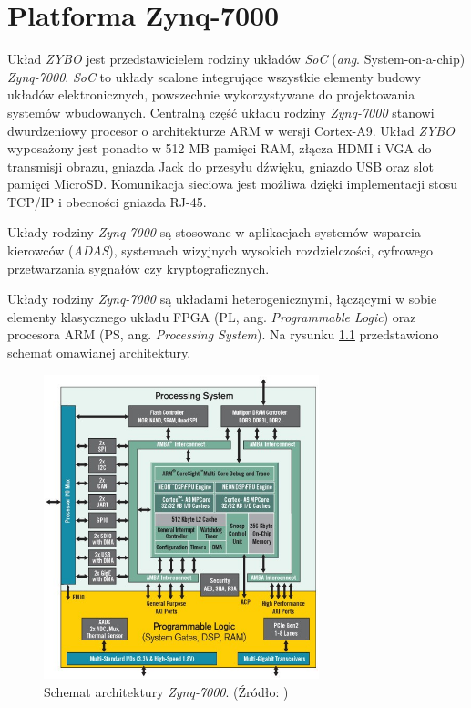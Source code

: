 \chapter{Platforma Zynq-7000}
\label{cha:platform}

Układ \emph{ZYBO} jest przedstawicielem rodziny układów \emph{SoC} (\emph{ang}. System-on-a-chip) \emph{Zynq-7000}. \emph{SoC} to układy scalone integrujące wszystkie elementy budowy układów elektronicznych, powszechnie wykorzystywane do projektowania systemów wbudowanych. Centralną część układu rodziny \emph{Zynq-7000} stanowi dwurdzeniowy procesor o architekturze ARM w wersji Cortex-A9. \cite{zynq-homepage} Układ \emph{ZYBO} wyposażony jest ponadto w 512 MB pamięci RAM, złącza HDMI i VGA do transmisji obrazu, gniazda Jack do przesyłu dźwięku, gniazdo USB oraz slot pamięci MicroSD. Komunikacja sieciowa jest możliwa dzięki implementacji stosu TCP/IP i obecności gniazda RJ-45. \cite{zynq-datasheet}

Układy rodziny \emph{Zynq-7000} są stosowane w aplikacjach systemów wsparcia kierowców (\emph{ADAS}), systemach wizyjnych wysokich rozdzielczości, cyfrowego przetwarzania sygnałów czy kryptograficznych. \cite{GuanwenZhong,MaleenAbeydeera,PawelDabal2014}

Układy rodziny \emph{Zynq-7000} są układami heterogenicznymi, łączącymi w sobie elementy klasycznego układu FPGA (PL, ang. \emph{Programmable Logic}) oraz procesora ARM (PS, ang. \emph{Processing System}). Na rysunku \ref{fig:zynq-overview} przedstawiono schemat omawianej architektury.

\begin{figure}[h]
	\centering
	\includegraphics[width=8cm]{img/zyng-platform.png}
	\caption{Schemat architektury \emph{Zynq-7000}. (Źródło: \cite{zybo-reference-manual})}
	\label{fig:zynq-overview}
\end{figure}

